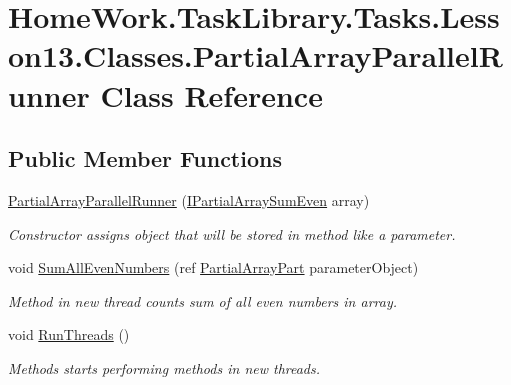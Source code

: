\hypertarget{class_home_work_1_1_task_library_1_1_tasks_1_1_lesson13_1_1_classes_1_1_partial_array_parallel_runner}{}\section{Home\+Work.\+Task\+Library.\+Tasks.\+Lesson13.\+Classes.\+Partial\+Array\+Parallel\+Runner Class Reference}
\label{class_home_work_1_1_task_library_1_1_tasks_1_1_lesson13_1_1_classes_1_1_partial_array_parallel_runner}
\subsection*{Public Member Functions}
\begin{DoxyCompactItemize}
\item 
\mbox{\hyperlink{class_home_work_1_1_task_library_1_1_tasks_1_1_lesson13_1_1_classes_1_1_partial_array_parallel_runner_a330e50c3deee343adea29eda23cb192b}{Partial\+Array\+Parallel\+Runner}} (\mbox{\hyperlink{interface_home_work_1_1_task_library_1_1_tasks_1_1_lesson13_1_1_interfaces_1_1_i_partial_array_sum_even}{I\+Partial\+Array\+Sum\+Even}} array)
\begin{DoxyCompactList}\small\item\em Constructor assigns object that will be stored in method like a parameter. \end{DoxyCompactList}\item 
void \mbox{\hyperlink{class_home_work_1_1_task_library_1_1_tasks_1_1_lesson13_1_1_classes_1_1_partial_array_parallel_runner_ad3eb4340f27986b7e82a45d4d5be4d5f}{Sum\+All\+Even\+Numbers}} (ref \mbox{\hyperlink{class_home_work_1_1_task_library_1_1_tasks_1_1_lesson13_1_1_classes_1_1_partial_array_part}{Partial\+Array\+Part}} parameter\+Object)
\begin{DoxyCompactList}\small\item\em Method in new thread counts sum of all even numbers in array. \end{DoxyCompactList}\item 
void \mbox{\hyperlink{class_home_work_1_1_task_library_1_1_tasks_1_1_lesson13_1_1_classes_1_1_partial_array_parallel_runner_a3694708d460f77f6b5c8d0434922b8d1}{Run\+Threads}} ()
\begin{DoxyCompactList}\small\item\em Methods starts performing methods in new threads. \end{DoxyCompactList}\end{DoxyCompactItemize}
